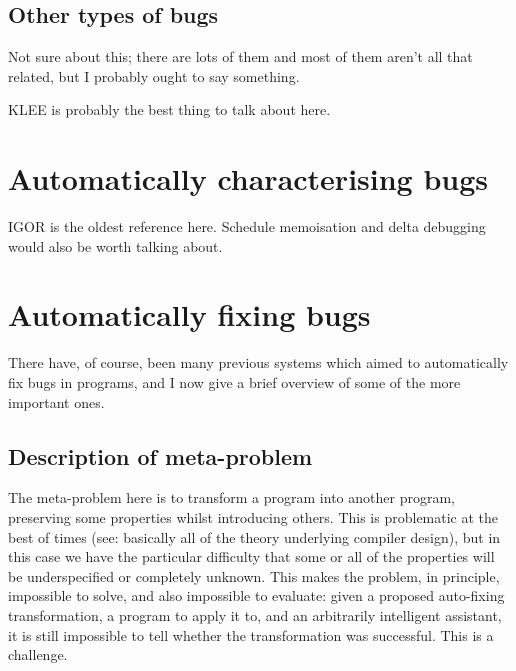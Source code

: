 \subsection{Other types of bugs}

Not sure about this; there are lots of them and most of them aren't
all that related, but I probably ought to say something.

KLEE is probably the best thing to talk about here.

\section{Automatically characterising bugs}

IGOR is the oldest reference here.  Schedule memoisation and delta
debugging would also be worth talking about.  

\section{Automatically fixing bugs}

There have, of course, been many previous systems which aimed to
automatically fix bugs in programs, and I now give a brief overview of
some of the more important ones.

\subsection{Description of meta-problem}

The meta-problem here is to transform a program into another program,
preserving some properties whilst introducing others.  This is
problematic at the best of times (see: basically all of the theory
underlying compiler design), but in this case we have the particular
difficulty that some or all of the properties will be underspecified
or completely unknown.  This makes the problem, in principle,
impossible to solve, and also impossible to evaluate: given a proposed
auto-fixing transformation, a program to apply it to, and an
arbitrarily intelligent assistant, it is still impossible to tell
whether the transformation was successful.  This is a
challenge.

